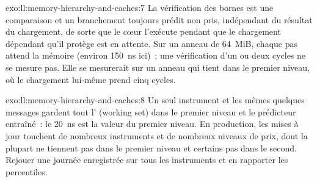 \begin{solution}{exo:ll:memory-hierarchy-and-caches:7}
La vérification des bornes est une comparaison et un branchement toujours prédit non pris, indépendant du résultat du chargement, de sorte que
le cœur l'exécute pendant que le chargement dépendant qu'il protège est en attente. Sur un anneau de 64~MiB, chaque pas attend la mémoire
(environ \qty{150}{\nano\second} ici)~; une vérification d'un ou deux cycles ne se mesure pas. Elle se mesurerait sur un anneau qui tient dans le premier
niveau, où le chargement lui-même prend cinq cycles.
\end{solution}

\begin{solution}{exo:ll:memory-hierarchy-and-caches:8}
Un seul instrument et les mêmes quelques messages gardent tout l' (working set) dans le premier niveau et le prédicteur entraîné~: le
\qty{20}{\nano\second} est la valeur du premier niveau. En production, les mises à jour touchent de nombreux instruments et de nombreux niveaux de prix,
dont la plupart ne tiennent pas dans le premier niveau et certains pas dans le second. Rejouer une journée enregistrée sur tous les instruments et
en rapporter les percentiles.
\end{solution}

